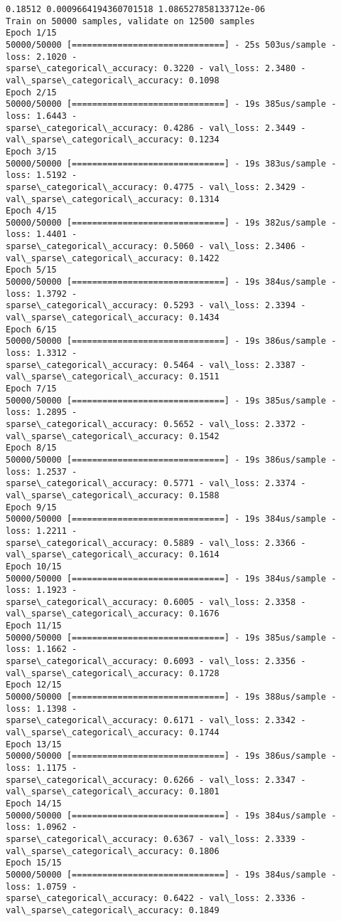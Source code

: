 \documentclass[11pt]{article}
\begin{document}
    \begin{Verbatim}[commandchars=\\\{\}]
0.18512 0.0009664194360701518 1.086527858133712e-06
Train on 50000 samples, validate on 12500 samples
Epoch 1/15
50000/50000 [==============================] - 25s 503us/sample - loss: 2.1020 -
sparse\_categorical\_accuracy: 0.3220 - val\_loss: 2.3480 -
val\_sparse\_categorical\_accuracy: 0.1098
Epoch 2/15
50000/50000 [==============================] - 19s 385us/sample - loss: 1.6443 -
sparse\_categorical\_accuracy: 0.4286 - val\_loss: 2.3449 -
val\_sparse\_categorical\_accuracy: 0.1234
Epoch 3/15
50000/50000 [==============================] - 19s 383us/sample - loss: 1.5192 -
sparse\_categorical\_accuracy: 0.4775 - val\_loss: 2.3429 -
val\_sparse\_categorical\_accuracy: 0.1314
Epoch 4/15
50000/50000 [==============================] - 19s 382us/sample - loss: 1.4401 -
sparse\_categorical\_accuracy: 0.5060 - val\_loss: 2.3406 -
val\_sparse\_categorical\_accuracy: 0.1422
Epoch 5/15
50000/50000 [==============================] - 19s 384us/sample - loss: 1.3792 -
sparse\_categorical\_accuracy: 0.5293 - val\_loss: 2.3394 -
val\_sparse\_categorical\_accuracy: 0.1434
Epoch 6/15
50000/50000 [==============================] - 19s 386us/sample - loss: 1.3312 -
sparse\_categorical\_accuracy: 0.5464 - val\_loss: 2.3387 -
val\_sparse\_categorical\_accuracy: 0.1511
Epoch 7/15
50000/50000 [==============================] - 19s 385us/sample - loss: 1.2895 -
sparse\_categorical\_accuracy: 0.5652 - val\_loss: 2.3372 -
val\_sparse\_categorical\_accuracy: 0.1542
Epoch 8/15
50000/50000 [==============================] - 19s 386us/sample - loss: 1.2537 -
sparse\_categorical\_accuracy: 0.5771 - val\_loss: 2.3374 -
val\_sparse\_categorical\_accuracy: 0.1588
Epoch 9/15
50000/50000 [==============================] - 19s 384us/sample - loss: 1.2211 -
sparse\_categorical\_accuracy: 0.5889 - val\_loss: 2.3366 -
val\_sparse\_categorical\_accuracy: 0.1614
Epoch 10/15
50000/50000 [==============================] - 19s 384us/sample - loss: 1.1923 -
sparse\_categorical\_accuracy: 0.6005 - val\_loss: 2.3358 -
val\_sparse\_categorical\_accuracy: 0.1676
Epoch 11/15
50000/50000 [==============================] - 19s 385us/sample - loss: 1.1662 -
sparse\_categorical\_accuracy: 0.6093 - val\_loss: 2.3356 -
val\_sparse\_categorical\_accuracy: 0.1728
Epoch 12/15
50000/50000 [==============================] - 19s 388us/sample - loss: 1.1398 -
sparse\_categorical\_accuracy: 0.6171 - val\_loss: 2.3342 -
val\_sparse\_categorical\_accuracy: 0.1744
Epoch 13/15
50000/50000 [==============================] - 19s 386us/sample - loss: 1.1175 -
sparse\_categorical\_accuracy: 0.6266 - val\_loss: 2.3347 -
val\_sparse\_categorical\_accuracy: 0.1801
Epoch 14/15
50000/50000 [==============================] - 19s 384us/sample - loss: 1.0962 -
sparse\_categorical\_accuracy: 0.6367 - val\_loss: 2.3339 -
val\_sparse\_categorical\_accuracy: 0.1806
Epoch 15/15
50000/50000 [==============================] - 19s 384us/sample - loss: 1.0759 -
sparse\_categorical\_accuracy: 0.6422 - val\_loss: 2.3336 -
val\_sparse\_categorical\_accuracy: 0.1849
    \end{Verbatim}
\end{document}
